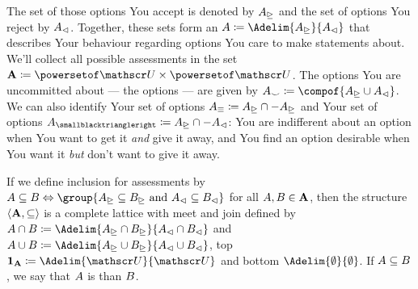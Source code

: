 \documentclass[preprint]{isipta2025}
\begin{document}
The set of those options You accept is denoted by \(A_\trianglerighteq\) and the set of options You reject by \(A_\vartriangleleft\).
Together, these sets form an  \(\A\coloneqq\Adelim{\A_\acc}{\A_\rej}\) that describes Your behaviour regarding options You care to make statements about.
We'll collect all possible assessments in the set~\(\As\coloneqq\powersetof\opts\times\powersetof\opts\).
The options You are uncommitted about --- the  options --- are given by
\(\A_{\unres}\coloneqq\compof{\A_\acc\cup\A_\rej}\).
We can also identify Your set of  options \(A_\equiv\coloneqq A_\trianglerighteq\cap-A_\trianglerighteq\) and Your set of  options \(\A_\des\coloneqq\A_\acc\cap-\A_\rej\):  You are indifferent about an option when You want to get it \emph{and} give it away, and You find an option desirable when You want it \emph{but} don't want to give it away.

If we define inclusion for assessments by \(\A\subseteq\otherA\ifandonlyif\group{\A_\acc\subseteq\otherA_\acc\text{ and }\A_\rej\subseteq\otherA_\rej}\) for all \(A,B\in\mathbf{A}\), then the structure \(\langle\mathbf{A},\subseteq\rangle\) is a complete lattice with meet and join defined by \(\A\intersection\otherA\coloneqq\Adelim{\A_\acc\intersection\otherA_\acc}{\A_\rej\intersection\otherA_\rej}\) and \(\A\union\otherA\coloneqq\Adelim{\A_\acc\union\otherA_\acc}{\A_\rej\union\otherA_\rej}\), top \(\Astop\coloneqq\Adelim{\opts}{\opts}\) and bottom \(\Adelim{\emptyset}{\emptyset}\).
If \(A\subseteq B\), we say that \(A\) is  than \(B\).
\end{document}
